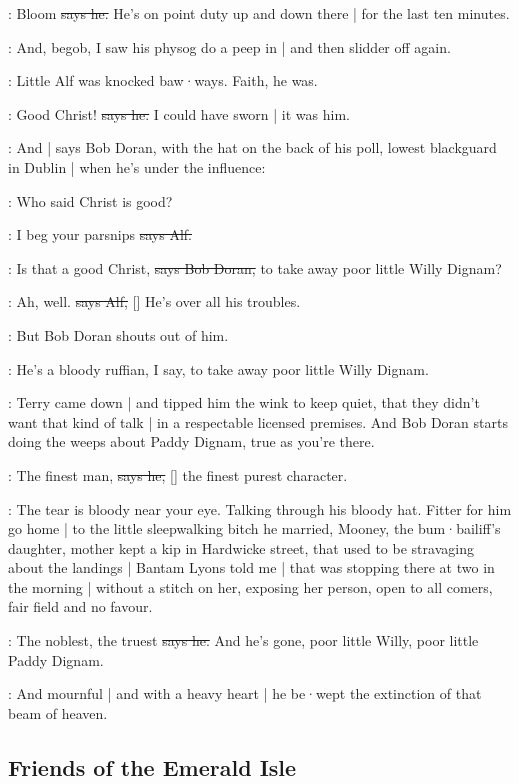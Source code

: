 \citizen:
Bloom
\sout{says he.}
He's on point duty up and down there |
for the last ten minutes.%

\Nq:
And,
begob,
I saw his physog do a peep in |
and then slidder off again.

\Nq:
Little Alf was knocked baw·ways.
Faith,
he was.

\bergan:
Good Christ!
\sout{says he.}
I could have sworn |
it was him.

\Nq:
And |
says Bob Doran,
with the hat on the back of his poll,
lowest blackguard in Dublin |
when he's under the influence:

\doran:
Who said Christ is good?

\bergan:
I beg your parsnips
\sout{says Alf.}

\doran:
Is that a good Christ,
\sout{says Bob Doran,}
to take away poor little Willy Dignam?

\bergan:
Ah,
well.
\sout{says Alf,}
[]
He's over all his troubles.

\Nq:
But Bob Doran shouts out of him.

\doran:
He's a bloody ruffian,
I say,
to take away poor little Willy Dignam.

\Nq:
Terry came down |
and tipped him the wink to keep quiet,
that they didn't want that kind of talk |
in a respectable licensed premises.
And Bob Doran starts doing the weeps about Paddy Dignam,
true as you're there.

\doran:
The finest man,
\sout{says he,}
[]
the finest purest character.

\Nq:
The tear is bloody near your eye.
Talking through his bloody hat.
Fitter for him go home |
to the little sleepwalking bitch he married,
Mooney,
the bum·bailiff's daughter,
mother kept a kip in Hardwicke street,
that used to be stravaging about the landings
 |
Bantam Lyons told me |
that was stopping there at two in the morning |
without a stitch on her,
exposing her person,
open to all comers,
fair field and no favour.

\doran:
The noblest,
the truest
\sout{says he.}
And he's gone,
poor little Willy,
poor little Paddy Dignam.

:
And mournful |
and with a heavy heart |
he be·wept the extinction of that beam of heaven.


\subsection*{Friends of the Emerald Isle}

